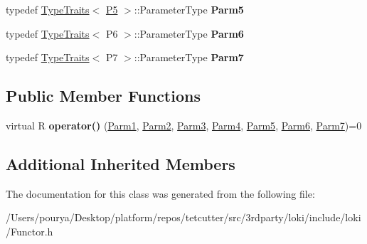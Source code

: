 \begin{DoxyCompactItemize}
\item 
\hypertarget{classLoki_1_1FunctorImpl_3_01R_00_01LOKI__TYPELIST__7_07P1_00_01P2_00_01P3_00_01P4_00_01P5_00_01b06f56baa72992ebef0383deced9a1f5_a24fead12ca08c1c27741b6c408c123f1}{}typedef \hyperlink{classLoki_1_1TypeTraits}{Type\+Traits}$<$ \hyperlink{structP5}{P5} $>$\+::Parameter\+Type {\bfseries Parm5}\label{classLoki_1_1FunctorImpl_3_01R_00_01LOKI__TYPELIST__7_07P1_00_01P2_00_01P3_00_01P4_00_01P5_00_01b06f56baa72992ebef0383deced9a1f5_a24fead12ca08c1c27741b6c408c123f1}

\item 
\hypertarget{classLoki_1_1FunctorImpl_3_01R_00_01LOKI__TYPELIST__7_07P1_00_01P2_00_01P3_00_01P4_00_01P5_00_01b06f56baa72992ebef0383deced9a1f5_aea6f2dc8a2ac27ea32313747cc44495e}{}typedef \hyperlink{classLoki_1_1TypeTraits}{Type\+Traits}$<$ P6 $>$\+::Parameter\+Type {\bfseries Parm6}\label{classLoki_1_1FunctorImpl_3_01R_00_01LOKI__TYPELIST__7_07P1_00_01P2_00_01P3_00_01P4_00_01P5_00_01b06f56baa72992ebef0383deced9a1f5_aea6f2dc8a2ac27ea32313747cc44495e}

\item 
\hypertarget{classLoki_1_1FunctorImpl_3_01R_00_01LOKI__TYPELIST__7_07P1_00_01P2_00_01P3_00_01P4_00_01P5_00_01b06f56baa72992ebef0383deced9a1f5_af49dc3f49bc66852281b28e668f8c214}{}typedef \hyperlink{classLoki_1_1TypeTraits}{Type\+Traits}$<$ P7 $>$\+::Parameter\+Type {\bfseries Parm7}\label{classLoki_1_1FunctorImpl_3_01R_00_01LOKI__TYPELIST__7_07P1_00_01P2_00_01P3_00_01P4_00_01P5_00_01b06f56baa72992ebef0383deced9a1f5_af49dc3f49bc66852281b28e668f8c214}

\end{DoxyCompactItemize}
\subsection*{Public Member Functions}
\begin{DoxyCompactItemize}
\item 
\hypertarget{classLoki_1_1FunctorImpl_3_01R_00_01LOKI__TYPELIST__7_07P1_00_01P2_00_01P3_00_01P4_00_01P5_00_01b06f56baa72992ebef0383deced9a1f5_acb82082b892c01c3840447ba970c8c22}{}virtual R {\bfseries operator()} (\hyperlink{classLoki_1_1EmptyType}{Parm1}, \hyperlink{classLoki_1_1EmptyType}{Parm2}, \hyperlink{classLoki_1_1EmptyType}{Parm3}, \hyperlink{classLoki_1_1EmptyType}{Parm4}, \hyperlink{classLoki_1_1EmptyType}{Parm5}, \hyperlink{classLoki_1_1EmptyType}{Parm6}, \hyperlink{classLoki_1_1EmptyType}{Parm7})=0\label{classLoki_1_1FunctorImpl_3_01R_00_01LOKI__TYPELIST__7_07P1_00_01P2_00_01P3_00_01P4_00_01P5_00_01b06f56baa72992ebef0383deced9a1f5_acb82082b892c01c3840447ba970c8c22}

\end{DoxyCompactItemize}
\subsection*{Additional Inherited Members}


The documentation for this class was generated from the following file\+:\begin{DoxyCompactItemize}
\item 
/\+Users/pourya/\+Desktop/platform/repos/tetcutter/src/3rdparty/loki/include/loki/Functor.\+h\end{DoxyCompactItemize}
